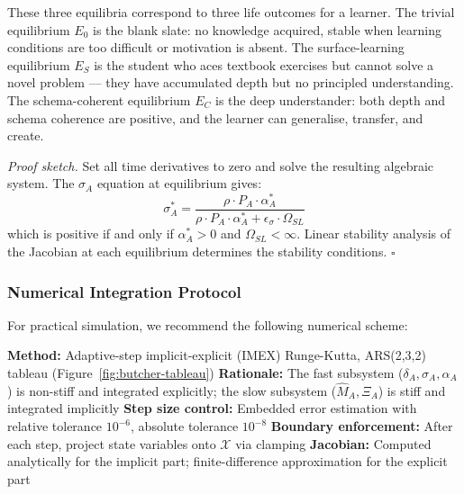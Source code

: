 \documentclass[10pt]{article}
\begin{document}
These three equilibria correspond to three life outcomes for a learner. The trivial equilibrium $E_0$ is the blank slate: no knowledge acquired, stable when learning conditions are too difficult or motivation is absent. The surface-learning equilibrium $E_S$ is the student who aces textbook exercises but cannot solve a novel problem --- they have accumulated depth but no principled understanding. The schema-coherent equilibrium $E_C$ is the deep understander: both depth and schema coherence are positive, and the learner can generalise, transfer, and create.

\textit{Proof sketch.} Set all time derivatives to zero and solve the
resulting algebraic system. The $\sigma_A$ equation at equilibrium gives:
\begin{equation}\label{eq:sigma-equilibrium}
\sigma_A^* = \frac{\rho \cdot P_A \cdot \alpha_A^*}{\rho \cdot P_A \cdot \alpha_A^* + \epsilon_\sigma \cdot \Omega_{SL}}
\end{equation}
which is positive if and only if $\alpha_A^* > 0$ and $\Omega_{SL} < \infty$.
Linear stability analysis of the Jacobian at each equilibrium determines
the stability conditions. $\square$

\subsubsection{Numerical Integration Protocol}\label{sec:numerical-protocol}

For practical simulation, we recommend the following numerical scheme:

\begin{algorithm}[H]
\caption{Σ-Model ODE Integration}\label{alg:ode-integration}
\begin{algorithmic}
\State \textbf{Method:} Adaptive-step implicit-explicit (IMEX) Runge-Kutta, ARS(2,3,2) tableau (Figure~\ref{fig:butcher-tableau})
\State \textbf{Rationale:} The fast subsystem ($\delta_A, \sigma_A, \alpha_A$) is non-stiff and integrated explicitly; the slow subsystem ($\hat{M}_A, \Xi_A$) is stiff and integrated implicitly
\State \textbf{Step size control:} Embedded error estimation with relative tolerance $10^{-6}$, absolute tolerance $10^{-8}$
\State \textbf{Boundary enforcement:} After each step, project state variables onto $\mathcal{X}$ via clamping
\State \textbf{Jacobian:} Computed analytically for the implicit part; finite-difference approximation for the explicit part
\end{algorithmic}
\end{algorithm}
\end{document}

